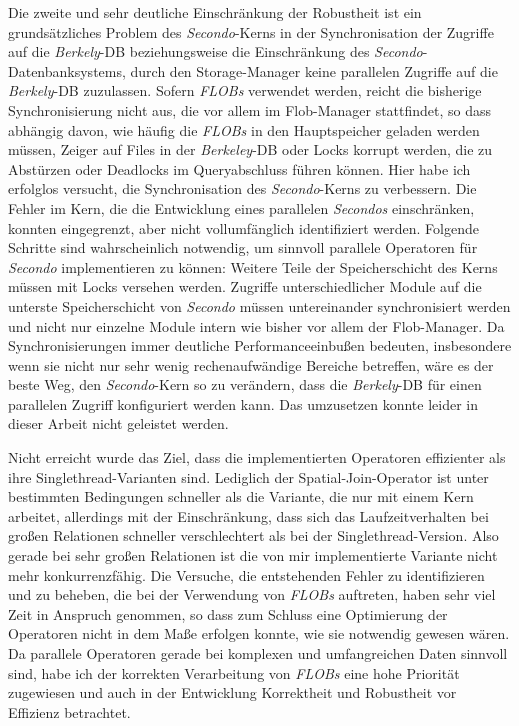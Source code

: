 \documentclass[a4paper,12pt,twoside]{article}
\newcommand{\Fb}[1]{\textit{#1}} %
\begin{document}
Die zweite und sehr deutliche Einschränkung der Robustheit ist ein grundsätzliches Problem des \Fb{Secondo}-Kerns in der Synchronisation der Zugriffe auf die \Fb{Berkely}-DB beziehungsweise die Einschränkung des \Fb{Secondo}-Datenbanksystems, durch den Storage-Manager keine parallelen Zugriffe auf die \Fb{Berkely}-DB zuzulassen. Sofern \Fb{FLOBs} verwendet werden, reicht die bisherige Synchronisierung nicht aus, die vor allem im Flob-Manager stattfindet, so dass abhängig davon, wie häufig die \Fb{FLOBs} in den Hauptspeicher geladen werden müssen, Zeiger auf Files in der \Fb{Berkeley}-DB oder Locks korrupt werden, die zu Abstürzen oder Deadlocks im Queryabschluss führen können. Hier habe ich erfolglos versucht, die Synchronisation des \Fb{Secondo}-Kerns zu verbessern. Die Fehler im Kern, die die Entwicklung eines parallelen \Fb{Secondos} einschränken, konnten eingegrenzt, aber nicht vollumfänglich identifiziert werden. Folgende Schritte sind wahrscheinlich notwendig, um sinnvoll parallele Operatoren für \Fb{Secondo} implementieren zu können: Weitere Teile der Speicherschicht des Kerns müssen mit Locks versehen werden. Zugriffe unterschiedlicher Module auf die unterste Speicherschicht von \Fb{Secondo} müssen untereinander synchronisiert werden und nicht nur einzelne Module intern wie bisher vor allem der Flob-Manager. Da Synchronisierungen immer deutliche Performanceeinbußen bedeuten, insbesondere wenn sie nicht nur sehr wenig rechenaufwändige Bereiche betreffen, wäre es der beste Weg, den \Fb{Secondo}-Kern so zu verändern, dass die \Fb{Berkely}-DB für einen parallelen Zugriff konfiguriert werden kann. Das umzusetzen konnte leider in dieser Arbeit nicht geleistet werden. 

Nicht erreicht wurde das Ziel, dass die implementierten Operatoren effizienter als ihre Singlethread-Varianten sind. Lediglich der Spatial-Join-Operator ist unter bestimmten Bedingungen schneller als die Variante, die nur mit einem Kern arbeitet, allerdings mit der Einschränkung, dass sich das Laufzeitverhalten bei großen Relationen schneller verschlechtert als bei der Singlethread-Version. Also gerade bei sehr großen Relationen ist die von mir implementierte Variante nicht mehr konkurrenzfähig. Die Versuche, die entstehenden Fehler zu identifizieren und zu beheben, die bei der Verwendung von \Fb{FLOBs} auftreten, haben sehr viel Zeit in Anspruch genommen, so dass zum Schluss eine Optimierung der Operatoren nicht in dem Maße erfolgen konnte, wie sie notwendig gewesen wären. Da parallele Operatoren gerade bei komplexen und umfangreichen Daten sinnvoll sind, habe ich der korrekten Verarbeitung von \Fb{FLOBs} eine hohe Priorität zugewiesen und auch in der Entwicklung Korrektheit und Robustheit vor Effizienz betrachtet.
\end{document}

